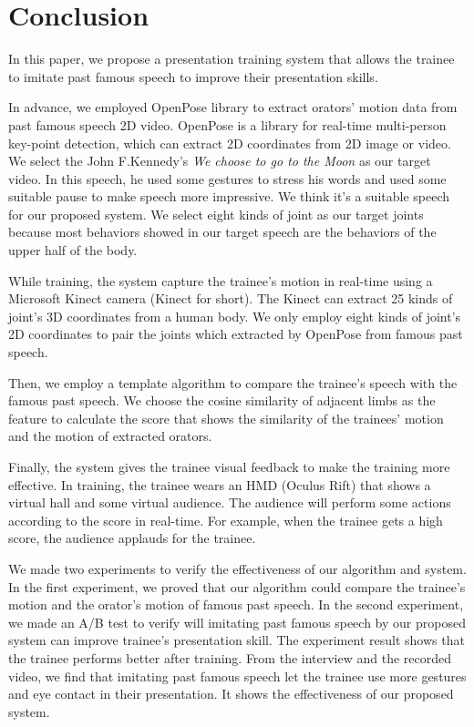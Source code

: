 \chapter{Conclusion}
\par In this paper, we propose a presentation training system that allows the trainee to imitate past famous speech to improve their presentation skills. 
\par In advance, we employed OpenPose library\cite{cao2017realtime} to extract orators' motion data from past famous speech 2D video. OpenPose is a library for real-time multi-person key-point detection, which can extract 2D coordinates from 2D image or video. We select the John F.Kennedy's \emph{We choose to go to the Moon} as our target video. In this speech, he used some gestures to stress his words and used some suitable pause to make speech more impressive. We think it's a suitable speech for our proposed system.
We select eight kinds of joint as our target joints because most behaviors showed in our target speech are the behaviors of the upper half of the body. 
\par While training, the system capture the trainee's motion in real-time using a Microsoft Kinect camera (Kinect for short). The Kinect can extract 25 kinds of joint's 3D coordinates from a human body. We only employ eight kinds of joint's 2D coordinates to pair the joints which extracted by OpenPose from famous past speech. 
\par Then, we employ a template algorithm to compare the trainee's speech with the famous past speech. We choose the cosine similarity of adjacent limbs as the feature to calculate the score that shows the similarity of the trainees' motion and the motion of extracted orators.
\par Finally, the system gives the trainee visual feedback to make the training more effective. In training, the trainee wears an HMD (Oculus Rift) that shows a virtual hall and some virtual audience. The audience will perform some actions according to the score in real-time. For example, when the trainee gets a high score, the audience applauds for the trainee.

\par We made two experiments to verify the effectiveness of our algorithm and system. In the first experiment, we proved that our algorithm could compare the trainee's motion and the orator's motion of famous past speech. In the second experiment, we made an A/B test to verify will imitating past famous speech by our proposed system can improve trainee's presentation skill. The experiment result shows that the trainee performs better after training. From the interview and the recorded video, we find that imitating past famous speech let the trainee use more gestures and eye contact in their presentation. It shows the effectiveness of our proposed system.

